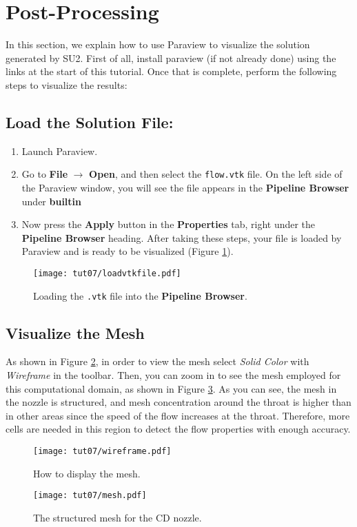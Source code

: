 \section*{Post-Processing}
In this section, we explain how to use Paraview to visualize the solution generated by SU2. First of all, install paraview (if not already done) using the links at the start of this tutorial. Once that is complete, perform the following steps to visualize the results:
\subsection{Load the Solution File:}
\begin{enumerate}[label=\arabic*)]
	\item Launch Paraview.
	\item Go to \textbf{File} $\rightarrow$ \textbf{Open}, and then select the \texttt{flow.vtk} file. On the left side of the Paraview window, you will see the file appears in the \textbf{Pipeline Browser} under \textbf{builtin}
	\item Now press the \textbf{Apply} button in the \textbf{Properties} tab, right under the \textbf{Pipeline Browser} heading. After taking these steps, your file is loaded by Paraview and is ready to be visualized (Figure \ref{fig7:load}).
\end{enumerate}
\begin{figure}[ht]
	\centering
	\texttt{[image: tut07/loadvtkfile.pdf]}
	\caption{Loading the \texttt{.vtk} file into the \textbf{Pipeline Browser}.}
	\label{fig7:load}
\end{figure}
\subsection{Visualize the Mesh}
As shown in Figure \ref{fig7:wireframe}, in order to view the mesh select \textit{Solid Color} with \textit{Wireframe} in the toolbar. Then, you can zoom in to see the mesh employed for this computational domain, as shown in Figure \ref{fig7:mesh}. As you can see, the mesh in the nozzle is structured, and mesh concentration around the throat is higher than in other areas since the speed of the flow increases at the throat. Therefore, more cells are needed in this region to detect the flow properties with enough accuracy.
\begin{figure}[ht]
	\centering
	\texttt{[image: tut07/wireframe.pdf]}
	\caption{How to display the mesh.}
	\label{fig7:wireframe}
\end{figure}
\begin{figure}[ht]
	\centering
	\texttt{[image: tut07/mesh.pdf]}
	\caption{The structured mesh for the CD nozzle.}
	\label{fig7:mesh}
\end{figure}
